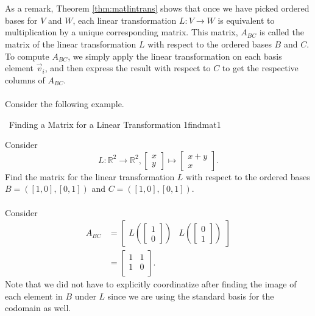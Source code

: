         \vphantom
        \\
        \\
        As a remark, Theorem \ref{thm:matlintrans} shows that once we have picked ordered bases for \(V\) and \(W\), each linear transformation \(L:V\to W\) is equivalent to multiplication by a unique corresponding matrix. This matrix, \(A_{BC}\) is called the matrix of the linear transformation \(L\) with respect to the ordered bases \(B\) and \(C\). To compute \(A_{BC}\), we simply apply the linear transformation on each basis element \(\vec{v}_i\), and then express the result with respect to \(C\) to get the respective columns of \(A_{BC}\).
        \pagebreak
        \vphantom
        \\
        \\
        Consider the following example.
        \begin{example}{\Difficulty\,\Difficulty\,\,Finding a Matrix for a Linear Transformation 1}{findmat1}
            
            Consider
            \begin{equation*}
                L:\mathbb{R}^2\to\mathbb{R}^2, \begin{bmatrix} x \\ y \end{bmatrix} \mapsto \begin{bmatrix} x+y \\ x \end{bmatrix}.
            \end{equation*}
            Find the matrix for the linear transformation \(L\) with respect to the ordered bases \(B=([1,0],[0,1])\) and \(C=([1,0],[0,1])\).
            \\
            \\
            Consider
            \begin{align*}
                A_{BC}&=\begin{bmatrix}
                    L\left(\begin{bmatrix} 1 \\ 0 \end{bmatrix}\right) & L\left(\begin{bmatrix} 0 \\ 1 \end{bmatrix}\right)
                \end{bmatrix} \\
                &=\begin{bmatrix}
                    1 & 1 \\
                    1 & 0 \\
                \end{bmatrix}.
            \end{align*}
            Note that we did not have to explicitly coordinatize after finding the image of each element in \(B\) under \(L\) since we are using the standard basis for the codomain as well.
        \end{example}

